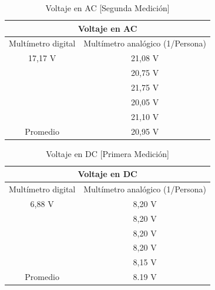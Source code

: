 \documentclass[letterpaper, 12pt]{report}
\begin{document}
\begin{table}[H]
	\begin{center}
		\begin{tabular}{|c|c|}
			\multicolumn{2}{c}{Voltaje en AC}                     \\ \hline
			Multímetro digital & Multímetro analógico (1/Persona) \\ \hline
			17,17 V            & 21,08 V                          \\
			                   & 20,75 V                          \\
			                   & 21,75 V                          \\
			                   & 20,05 V                          \\
			                   & 21,10 V                          \\ \hline
			Promedio           & 20,95 V                          \\ \hline
		\end{tabular}
		\caption{Voltaje en AC [Segunda Medición]}
		\label{tab:voltajeAC_2}
	\end{center}
\end{table}


\begin{table}[H]
	\begin{center}
		\begin{tabular}{|c|c|}
			\multicolumn{2}{c}{Voltaje en DC}                     \\ \hline
			Multímetro digital & Multímetro analógico (1/Persona) \\ \hline
			6,88 V             & 8,20 V                           \\
			                   & 8,20 V                           \\
			                   & 8,20 V                           \\
			                   & 8,20 V                           \\
			                   & 8,15 V                           \\ \hline
			Promedio           & 8.19 V                           \\ \hline
		\end{tabular}
		\caption{Voltaje en DC [Primera Medición]}
		\label{tab:voltajeDC_1}
	\end{center}
\end{table}
\end{document}
